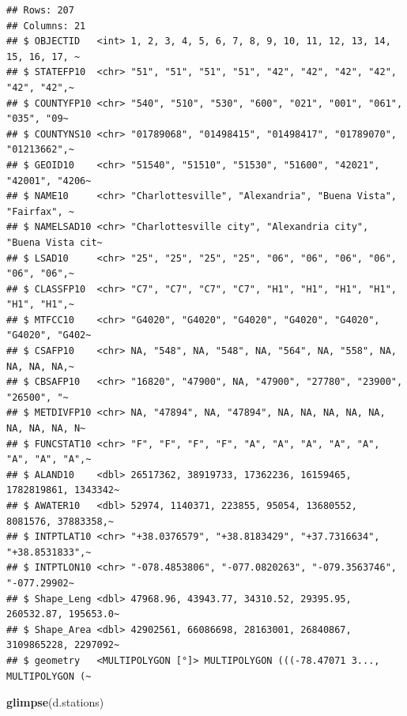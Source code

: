 \documentclass[]{article}
\newenvironment{Shaded}{\begin{snugshade}}{\end{snugshade}}
\newcommand{\FunctionTok}[1]{\textcolor[rgb]{0.13,0.29,0.53}{\textbf{#1}}}
\newcommand{\NormalTok}[1]{#1}
\begin{document}
\begin{verbatim}
## Rows: 207
## Columns: 21
## $ OBJECTID   <int> 1, 2, 3, 4, 5, 6, 7, 8, 9, 10, 11, 12, 13, 14, 15, 16, 17, ~
## $ STATEFP10  <chr> "51", "51", "51", "51", "42", "42", "42", "42", "42", "42",~
## $ COUNTYFP10 <chr> "540", "510", "530", "600", "021", "001", "061", "035", "09~
## $ COUNTYNS10 <chr> "01789068", "01498415", "01498417", "01789070", "01213662",~
## $ GEOID10    <chr> "51540", "51510", "51530", "51600", "42021", "42001", "4206~
## $ NAME10     <chr> "Charlottesville", "Alexandria", "Buena Vista", "Fairfax", ~
## $ NAMELSAD10 <chr> "Charlottesville city", "Alexandria city", "Buena Vista cit~
## $ LSAD10     <chr> "25", "25", "25", "25", "06", "06", "06", "06", "06", "06",~
## $ CLASSFP10  <chr> "C7", "C7", "C7", "C7", "H1", "H1", "H1", "H1", "H1", "H1",~
## $ MTFCC10    <chr> "G4020", "G4020", "G4020", "G4020", "G4020", "G4020", "G402~
## $ CSAFP10    <chr> NA, "548", NA, "548", NA, "564", NA, "558", NA, NA, NA, NA,~
## $ CBSAFP10   <chr> "16820", "47900", NA, "47900", "27780", "23900", "26500", "~
## $ METDIVFP10 <chr> NA, "47894", NA, "47894", NA, NA, NA, NA, NA, NA, NA, NA, N~
## $ FUNCSTAT10 <chr> "F", "F", "F", "F", "A", "A", "A", "A", "A", "A", "A", "A",~
## $ ALAND10    <dbl> 26517362, 38919733, 17362236, 16159465, 1782819861, 1343342~
## $ AWATER10   <dbl> 52974, 1140371, 223855, 95054, 13680552, 8081576, 37883358,~
## $ INTPTLAT10 <chr> "+38.0376579", "+38.8183429", "+37.7316634", "+38.8531833",~
## $ INTPTLON10 <chr> "-078.4853806", "-077.0820263", "-079.3563746", "-077.29902~
## $ Shape_Leng <dbl> 47968.96, 43943.77, 34310.52, 29395.95, 260532.87, 195653.0~
## $ Shape_Area <dbl> 42902561, 66086698, 28163001, 26840867, 3109865228, 2297092~
## $ geometry   <MULTIPOLYGON [°]> MULTIPOLYGON (((-78.47071 3..., MULTIPOLYGON (~
\end{verbatim}

\begin{Shaded}
\begin{Highlighting}[]
\FunctionTok{glimpse}\NormalTok{(d.stations)}
\end{Highlighting}
\end{Shaded}
\end{document}
